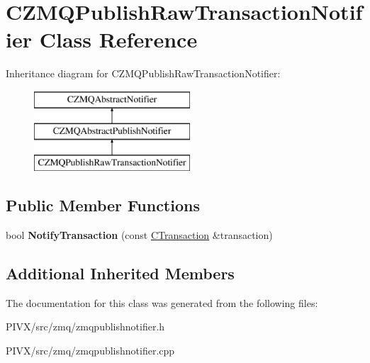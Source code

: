 \hypertarget{class_c_z_m_q_publish_raw_transaction_notifier}{}\section{C\+Z\+M\+Q\+Publish\+Raw\+Transaction\+Notifier Class Reference}
\label{class_c_z_m_q_publish_raw_transaction_notifier}
Inheritance diagram for C\+Z\+M\+Q\+Publish\+Raw\+Transaction\+Notifier\+:\begin{figure}[H]
\begin{center}
\leavevmode
\includegraphics[height=3.000000cm]{class_c_z_m_q_publish_raw_transaction_notifier}
\end{center}
\end{figure}
\subsection*{Public Member Functions}
\begin{DoxyCompactItemize}
\item 
\mbox{\label{class_c_z_m_q_publish_raw_transaction_notifier_a434db5fe779bebb7da0efcb61c9a1f59}} 
bool {\bfseries Notify\+Transaction} (const \mbox{\hyperlink{class_c_transaction}{C\+Transaction}} \&transaction)
\end{DoxyCompactItemize}
\subsection*{Additional Inherited Members}


The documentation for this class was generated from the following files\+:\begin{DoxyCompactItemize}
\item 
P\+I\+V\+X/src/zmq/zmqpublishnotifier.\+h\item 
P\+I\+V\+X/src/zmq/zmqpublishnotifier.\+cpp\end{DoxyCompactItemize}
